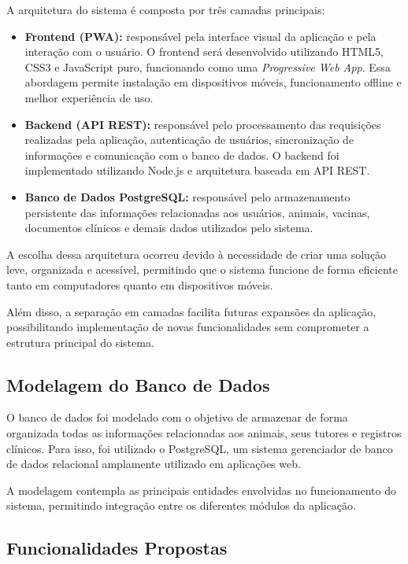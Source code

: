 \documentclass{UNESC}
\begin{document}
A arquitetura do sistema é composta por três camadas principais:

\begin{itemize}
    \item \textbf{Frontend (PWA):} responsável pela interface visual da aplicação e pela interação com o usuário. O frontend será desenvolvido utilizando HTML5, CSS3 e JavaScript puro, funcionando como uma \textit{Progressive Web App}. Essa abordagem permite instalação em dispositivos móveis, funcionamento offline e melhor experiência de uso.

    \item \textbf{Backend (API REST):} responsável pelo processamento das requisições realizadas pela aplicação, autenticação de usuários, sincronização de informações e comunicação com o banco de dados. O backend foi implementado utilizando Node.js e arquitetura baseada em API REST.

    \item \textbf{Banco de Dados PostgreSQL:} responsável pelo armazenamento persistente das informações relacionadas aos usuários, animais, vacinas, documentos clínicos e demais dados utilizados pelo sistema.
\end{itemize}

A escolha dessa arquitetura ocorreu devido à necessidade de criar uma solução leve, organizada e acessível, permitindo que o sistema funcione de forma eficiente tanto em computadores quanto em dispositivos móveis.

Além disso, a separação em camadas facilita futuras expansões da aplicação, possibilitando implementação de novas funcionalidades sem comprometer a estrutura principal do sistema.

\subsection{Modelagem do Banco de Dados}

O banco de dados foi modelado com o objetivo de armazenar de forma organizada todas as informações relacionadas aos animais, seus tutores e registros clínicos. Para isso, foi utilizado o PostgreSQL, um sistema gerenciador de banco de dados relacional amplamente utilizado em aplicações web.

A modelagem contempla as principais entidades envolvidas no funcionamento do sistema, permitindo integração entre os diferentes módulos da aplicação.

\subsection{Funcionalidades Propostas}
\end{document}
